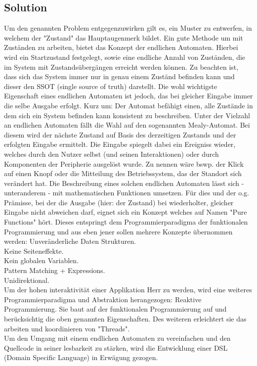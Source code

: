 \subsection{Solution}
\label{subsec:solution}

Um den genannten Problem entgegenzuwirken gilt es, ein Muster zu entwerfen,
in welchem der "Zustand" das Hauptaugenmerk bildet.
Ein gute Methode um mit Zuständen zu arbeiten, bietet das Konzept der endlichen Automaten.
Hierbei wird ein Startzustand festgelegt, sowie eine endliche Anzahl von Zuständen, die im System mit
Zustandsübergängen erreicht werden können. Zu beachten ist, dass sich das System immer nur in genau
einem Zuständ befinden kann und dieser den SSOT (single source of truth) darstellt.
Die wohl wichtigste Eigenschaft eines endlichen Automaten ist jedoch, das bei gleicher Eingabe
immer die selbe Ausgabe erfolgt.
Kurz um: Der Automat befähigt einen, alle Zustände in dem sich ein System befinden kann
konsistent zu beschreiben. 
Unter der Vielzahl an endlichen Automaten fällt die Wahl auf den sogenannten Mealy-Automat.
Bei diesem wird der nächste Zustand auf Basis des derzeitigen Zustands und der erfolgten Eingabe ermittelt.
Die Eingabe spiegelt dabei ein Ereigniss wieder, welches durch den Nutzer selbst (und seinen Interaktionen) 
oder durch Komponenten der Peripherie ausgelöst wurde. Zu nennen wäre bswp. 
der Klick auf einen Knopf oder die Mitteilung des Betriebssystem, das der Standort sich verändert hat.
Die Beschreibung eines solchen endlichen Automaten lässt sich - unteranderem - mit
mathematischen Funktionen umsetzen. Für dies und der o.g. Prämisse, bei der die Ausgabe (hier: der Zustand) bei wiederholter,
gleicher Eingabe nicht abweichen darf, eignet sich ein Konzept welches auf Namen "Pure Functions" hört.
Dieses entspringt dem Programmierparadigma der funktionalen Programmierung und aus eben jener sollen mehrere Konzepte übernommen werden:
Unveränderliche Daten Strukturen. \\
Keine Seiteneffekte. \\
Kein globalen Variablen. \\
Pattern Matching + Expressions. \\
Unidirektional.\\
Um der hohen interaktivität einer Applikation Herr zu werden, wird eine weiteres Programmierparadigma und
Abstraktion herangezogen: Reaktive Programmierung.
Sie baut auf der funktionalen Programmierung auf und berücksichtig die oben genannten Eigenschaften.
Des weiteren erleichtert sie das arbeiten und koordinieren von "Threads". 
\\
Um den Umgang mit einem endlichen Automaten zu vereinfachen und den Quellcode in seiner lesbarkeit zu stärken,
wird die Entwicklung einer DSL (Domain Specific Language) in Erwägung gezogen.


